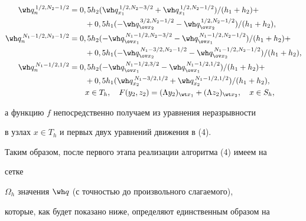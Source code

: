 \begin{align*}
\wh q_n^{\,1/2,N_2-1/2}&=


0,5h_2(\wh q_{x_1}^{\,1/2,N_2-3/2}+


\wh q_{x_1}^{\,1/2,N_2-1/2})/(h_1+h_2)+\\


&\qquad+0,5h_1


(-\wh q_{\ov x_2}^{\,3/2,N_2-1/2}-


\wh q_{\ov x_2}^{\,1/2,N_2-1/2})/(h_1+h_2),\\


%


\wh q_n^{\,N_1-1/2,N_2-1/2}&=0,5h_2(-\wh q_{\ov


x_1}^{\,N_1-1/2,N_2-3/2}-


\wh q_{\ov x_1}^{\,N_1-1/2,N_2-1/2})/(h_1+h_2)+\\


&\qquad+0,5h_1


(-\wh q_{\ov x_2}^{\,N_1-3/2,N_2-1/2}-


\wh q_{\ov x_2}^{\,N_1-1/2,N_2-1/2})/(h_1+h_2),\\


%


\wh q_n^{\,N_1-1/2,1/2}&=0,5h_2(-\wh q_{\ov x_1}^{\,N_1-1/2,3/2}-


\wh q_{\ov x_1}^{\,N_1-1/2,1/2})/(h_1+h_2)+\\


&\qquad+0,5h_1(\wh q_{x_2}^{\,N_1-3/2,1/2}+


\wh q_{x_2}^{\,N_1-1/2,1/2})/(h_1+h_2),\\


%


&\qquad x\in T_h,\quad


F(y_2,z_2)=(\Lambda y_2)_{\wt x_1}


+(\Lambda z_2)_{\wt x_2},\quad x\in S_h,


\end{align*}


а функцию $f$ непосредственно получаем из уравнения неразрывности


в узлах $x\in T_h$ и первых двух уравнений движения в (4).





Таким образом, после первого этапа реализации алгоритма (4) имеем на


сетке


$\Omega_h$ значения $\wh q$ (с точностью до произвольного слагаемого),


которые, как будет показано ниже, определяют единственным образом на


